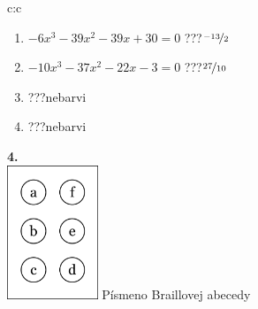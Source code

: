\documentclass[10pt]{report}
\begin{document}
\begin{tabular}{c:c}
\begin{minipage}[c][99mm][t]{0.49\linewidth}
\begin{center}
\begin{minipage}{0.77\linewidth}
\begin{center}
\begin{varwidth}{\textwidth}
\begin{enumerate}
\item $-6x^3-39x^2-39x+30=0$\quad \dotfill\; ???\;\dotfill \quad $\nicefrac{-13}{2}$
\item $-10x^3-37x^2-22x-3=0$\quad \dotfill\; ???\;\dotfill \quad $\nicefrac{27}{10}$
\item \quad \dotfill\; ???\;\dotfill \quad nebarvi
\item \quad \dotfill\; ???\;\dotfill \quad nebarvi
\end{enumerate}
\end{varwidth}
\end{center}
\end{minipage}
\begin{minipage}{0.20\linewidth}
\begin{center}
{\Huge\bfseries 4.} \\[2mm]
\includegraphics[height=40mm]{../images/braille.png}
{\small Písmeno Braillovej abecedy}
\end{center}
\end{minipage}
\end{center}
\end{minipage}

\end{tabular}
\clearpage
\thispagestyle{empty}
\end{document}
